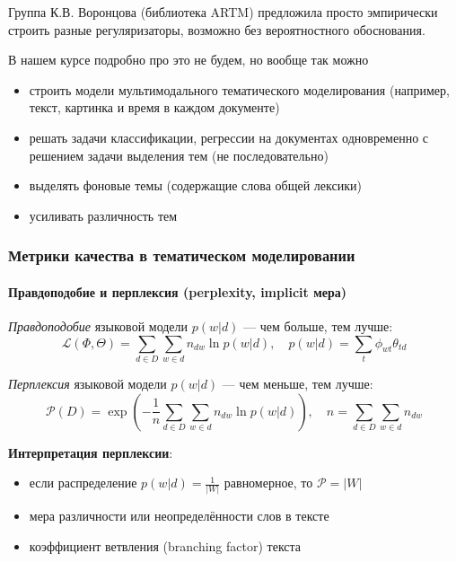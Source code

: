 \documentclass[fullscreen=true, bookmarks=true, hyperref={pdfencoding=unicode}]{beamer}
\begin{document}
\begin{frame}
  Группа К.В. Воронцова (библиотека ARTM) предложила просто эмпирически строить разные регуляризаторы, возможно без вероятностного обоснования.

  В нашем курсе подробно про это не будем, но вообще так можно
  \begin{itemize}
    \item строить модели мультимодального тематического моделирования (например, текст, картинка и время в каждом документе)
    \item решать задачи классификации, регрессии на документах одновременно с решением задачи выделения тем (не последовательно)
    \item выделять фоновые темы (содержащие слова общей лексики)
    \item усиливать различность тем
  \end{itemize}
\end{frame}


\begin{frame}
  \frametitle{Метрики качества в тематическом моделировании}
  \framesubtitle{Правдоподобие и перплексия (perplexity, implicit мера)}

  {\it Правдоподобие} языковой модели $p(w|d)$ — чем больше, тем лучше:
  $$ \mathcal{L} (\Phi, \Theta) = \sum\limits_{d \in D} \sum\limits_{w \in d} n_{dw} \ln p(w|d),
  \quad p(w|d) = \sum\limits_t \phi_{wt} \theta_{td}$$

  {\it Перплексия} языковой модели $p(w|d)$ — чем меньше, тем лучше:
  $$ \mathcal{P} (D) = \exp\left(-\frac{1}{n} \sum\limits_{d \in D} \sum\limits_{w \in d} n_{dw} \ln p(w|d) \right),
  \quad n = \sum\limits_{d \in D}\sum\limits_{w \in d} n_{dw}$$

 {\bf Интерпретация перплексии}:
 \begin{itemize}
   \item если распределение $p(w|d) = \frac{1}{|W|}$ равномерное, то $\mathcal{P} = |W|$
   \item мера различности или неопределённости слов в тексте
   \item коэффициент ветвления (branching factor) текста
 \end{itemize}
\end{frame}
\end{document}
